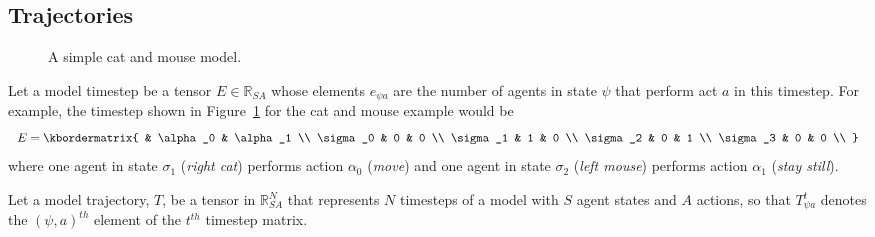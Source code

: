 \documentclass{article}
\begin{document}
\subsection{Trajectories}

\begin{figure}
	\centering
	\caption{A simple cat and mouse model.\label{fig:AB-MCMC-1}}
\end{figure}


Let a model timestep be a tensor $E \in \mathbb{R}_{SA}$ whose elements $e_{\psi a}$ are the number of agents in state $\psi$ that perform act $a$ in this timestep. For example, the timestep shown in Figure~\ref{fig:AB-MCMC-1} for the cat and mouse example would be
\[
E = \kbordermatrix{
	& \alpha_0 & \alpha_1 \\
	\sigma_0 & 0 & 0 \\
	\sigma_1 & 1 & 0 \\
	\sigma_2 & 0  & 1 \\
	\sigma_3 & 0 & 0 \\
}
\]
where one agent in state $\sigma_1$ (\textit{right cat}) performs action $\alpha_0$ (\textit{move}) and one agent in state $\sigma_2$ (\textit{left mouse}) performs action $\alpha_1$ (\textit{stay still}).

Let a model trajectory, $T$, be a tensor in $\mathbb{R}^N_{SA}$ that represents $N$ timesteps of a model with $S$ agent states and $A$ actions, so that $T^t_{\psi a}$ denotes the $(\psi, a)^{th}$ element of the $t^{th}$ timestep matrix.
\end{document}

